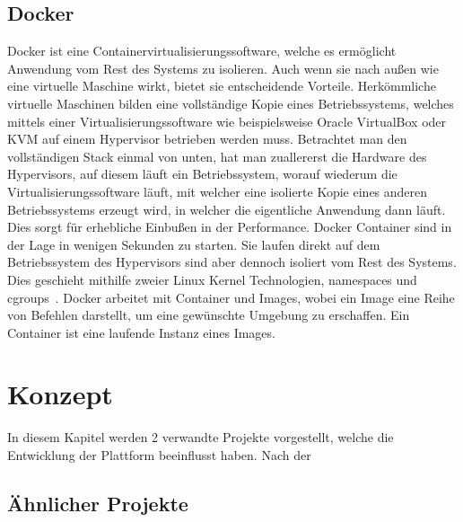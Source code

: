     \section{Docker}\label{sec:docker}
    Docker ist eine Containervirtualisierungssoftware, welche es ermöglicht Anwendung vom Rest des Systems zu isolieren.
    Auch wenn sie nach außen wie eine virtuelle Maschine wirkt, bietet sie entscheidende Vorteile.
    Herkömmliche virtuelle Maschinen bilden eine vollständige Kopie eines Betriebssystems, welches mittels einer Virtualisierungssoftware wie beispielsweise Oracle VirtualBox oder KVM auf einem Hypervisor betrieben werden muss.
    Betrachtet man den vollständigen Stack einmal von unten, hat man zuallererst die Hardware des Hypervisors, auf diesem läuft ein Betriebssystem, worauf wiederum die Virtualisierungssoftware läuft, mit welcher eine isolierte Kopie eines anderen Betriebssystems erzeugt wird, in welcher die eigentliche Anwendung dann läuft.
    Dies sorgt für erhebliche Einbußen in der Performance.
    Docker Container sind in der Lage in wenigen Sekunden zu starten.
    Sie laufen direkt auf dem Betriebssystem des Hypervisors sind aber dennoch isoliert vom Rest des Systems.
    Dies geschieht mithilfe zweier Linux Kernel Technologien, namespaces und cgroups~\cite{docker}.
    Docker arbeitet mit Container und Images, wobei ein Image eine Reihe von Befehlen darstellt, um eine gewünschte Umgebung zu erschaffen.
    Ein Container ist eine laufende Instanz eines Images.


    \chapter{Konzept}\label{ch:konzept}
    In diesem Kapitel werden 2 verwandte Projekte vorgestellt, welche die Entwicklung der Plattform beeinflusst haben.
    Nach der

    \section{Ähnlicher Projekte}\label{sec:analyse-ahnlicher-projekte}

